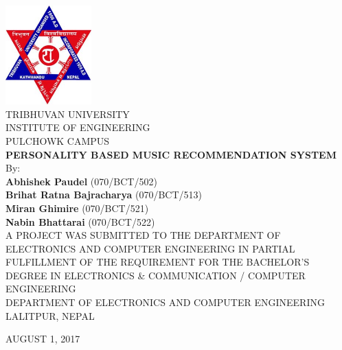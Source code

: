 

\thispagestyle{empty} %



{
  \thispagestyle{empty}
  \centering
  \normalsize
  
  \includegraphics[width=1.3in]{fig/tu-logo}\\
  {TRIBHUVAN UNIVERSITY}\\
  {INSTITUTE OF ENGINEERING}\\
  PULCHOWK CAMPUS
  \\[1.5cm]

  {\bf PERSONALITY BASED MUSIC RECOMMENDATION SYSTEM}\\[1.5cm]

  By:\\
  {\bf Abhishek Paudel} (070/BCT/502)\\
  {\bf Brihat Ratna Bajracharya} (070/BCT/513)\\
  {\bf Miran Ghimire} (070/BCT/521)\\
  {\bf Nabin Bhattarai} (070/BCT/522)\\[1.5cm]

  A PROJECT WAS SUBMITTED TO THE DEPARTMENT OF ELECTRONICS AND COMPUTER
  ENGINEERING IN PARTIAL FULFILLMENT OF THE REQUIREMENT FOR THE BACHELOR'S
  DEGREE IN ELECTRONICS \& COMMUNICATION / COMPUTER ENGINEERING\\[1.5cm]

  DEPARTMENT OF ELECTRONICS AND COMPUTER ENGINEERING\\
  LALITPUR, NEPAL

  \vfill
  AUGUST 1, 2017

}

